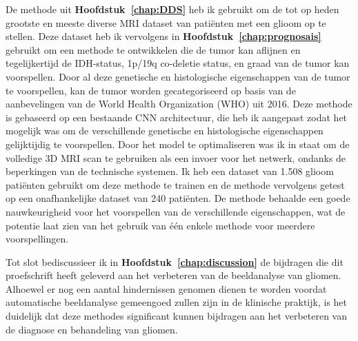 De methode uit \textbf{Hoofdstuk~\ref{chap:DDS}} heb ik gebruikt om de tot op heden grootste en meeste diverse MRI dataset van pati{\"e}nten met een glioom op te stellen.
Deze dataset heb ik vervolgens in \textbf{Hoofdstuk~\ref{chap:prognosais}} gebruikt om een methode te ontwikkelen die de tumor kan aflijnen en tegelijkertijd de IDH-status, 1p/19q co-deletie status, en graad van de tumor kan voorspellen.
Door al deze genetische en histologische eigenschappen van de tumor te voorspellen, kan de tumor worden gecategoriseerd op basis van de aanbevelingen van de World Health Organization (WHO) uit 2016.
Deze methode is gebaseerd op een bestaande CNN architectuur, die heb ik aangepast zodat het mogelijk was om de verschillende genetische en histologische eigenschappen gelijktijdig te voorspellen.
Door het model te optimaliseren was ik in staat om de volledige 3D MRI scan te gebruiken als een invoer voor het netwerk, ondanks de beperkingen van de technische systemen.
Ik heb een dataset van 1.508 glioom pati{\"e}nten gebruikt om deze methode te trainen en de methode vervolgens getest op een onafhankelijke dataset van 240 pati{\"e}nten.
De methode behaalde een goede nauwkeurigheid voor het voorspellen van de verschillende eigenschappen, wat de potentie laat zien van het gebruik van {\'e}{\'e}n enkele methode voor meerdere voorspellingen.

Tot slot bediscussieer ik in \textbf{Hoofdstuk~\ref{chap:discussion}} de bijdragen die dit proefschrift heeft geleverd aan het verbeteren van de beeldanalyse van gliomen.
Alhoewel er nog een aantal hindernissen genomen dienen te worden voordat automatische beeldanalyse gemeengoed zullen zijn in de klinische praktijk, is het duidelijk dat deze methodes significant kunnen bijdragen aan het verbeteren van de diagnose en behandeling van gliomen.


